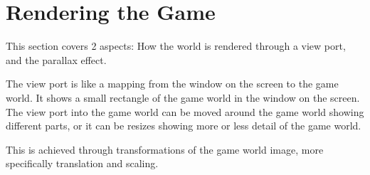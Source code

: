 \section{Rendering the Game}
This section covers 2 aspects: How the world is rendered through a view port, and the parallax effect.

The view port is like a mapping from the window on the screen to the game world.
It shows a small rectangle of the game world in the window on the screen.
The view port into the game world can be moved around the game world showing different parts, or it can be resizes showing more or less detail of the game world.

This is achieved through transformations of the game world image, more specifically translation and scaling.


